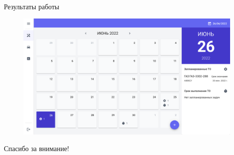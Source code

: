 \documentclass{beamer}
\begin{document}
\begin{frame}
    {Результаты работы}
    \begin{figure}[H]
        \centering
        \includegraphics[keepaspectratio,width=\textwidth]{presentation/images/tech.plumpalbert.xyz.technician.png}
    \end{figure}
\end{frame}

\begin{frame}
    \centering
    \huge{Спасибо за внимание!}
\end{frame}
\end{document}
